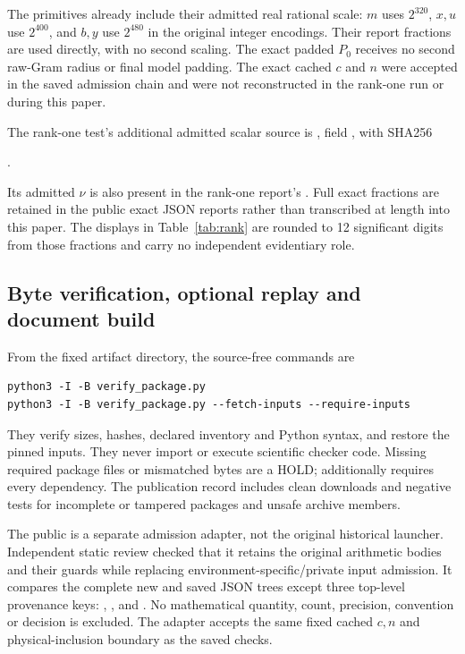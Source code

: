 \documentclass[11pt,a4paper]{article}
\newcommand{\hold}{\textsf{HOLD}}
\theoremstyle{definition}
\theoremstyle{remark}
\numberwithin{equation}{section}
\begin{document}
The primitives already include their admitted real rational scale:
$m$ uses $2^{320}$, $x,u$ use $2^{400}$, and $b,y$ use
$2^{480}$ in the original integer encodings. Their report fractions
are used directly, with no second scaling.
The exact padded $P_0$ receives no second raw-Gram radius or final
model padding. The exact cached $c$ and $n$ were accepted in the
saved admission chain and were not reconstructed in the rank-one run
or during this paper.

The rank-one test's additional admitted scalar source is
, field , with SHA256
\begin{center}\small
{}.
\end{center}
Its admitted $\nu$ is also present in the rank-one report's
. Full exact fractions are retained in the
public exact JSON reports rather than transcribed at length into this paper.
The displays in Table~\ref{tab:rank} are rounded to 12 significant
digits from those fractions and carry no independent evidentiary role.

\subsection{Byte verification, optional replay and document build}

From the fixed artifact directory, the source-free commands are
\begin{verbatim}
python3 -I -B verify_package.py
python3 -I -B verify_package.py --fetch-inputs --require-inputs
\end{verbatim}
They verify sizes, hashes, declared inventory and Python syntax, and
restore the pinned inputs. They never import or execute scientific
checker code. Missing required package files or mismatched bytes are a
\hold;  additionally requires every dependency.
The publication record includes clean downloads and negative tests for incomplete or
tampered packages and unsafe archive members.

The public  is a separate admission adapter,
not the original historical launcher. Independent static review checked
that it retains the original arithmetic bodies and their guards while
replacing environment-specific/private input admission. It compares the
complete new and saved JSON trees except three top-level provenance
keys: , , and
. No mathematical quantity, count, precision, convention
or decision is excluded. The adapter accepts the same fixed cached
$c,n$ and physical-inclusion boundary as the saved checks.
\end{document}
